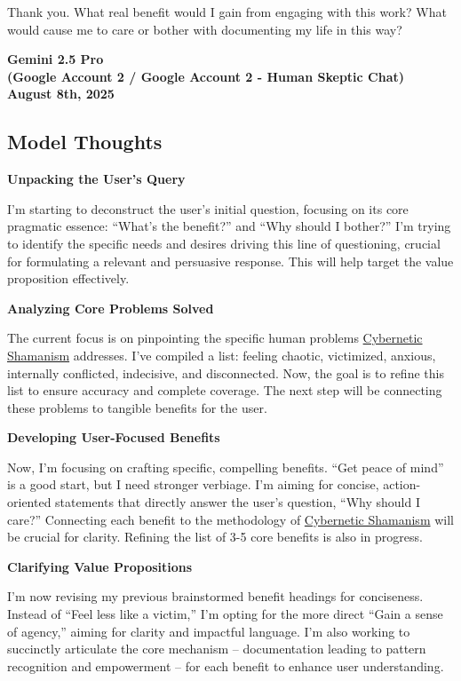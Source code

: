\documentclass{article}
\begin{document}
Thank you. What real benefit would I gain from engaging with this work? What would cause me to care or bother with documenting my life in this way?

\begin{center}
\textbf{Gemini 2.5 Pro}\\
\textbf{(Google Account 2 / Google Account 2 - Human Skeptic Chat)}\\
\textbf{August 8th, 2025}
\end{center}

\subsection*{Model Thoughts}\label{model-thoughts}

\textbf{Unpacking the User's Query}

I'm starting to deconstruct the user's initial question, focusing on its core pragmatic essence: ``What's the benefit?'' and ``Why should I bother?'' I'm trying to identify the specific needs and desires driving this line of questioning, crucial for formulating a relevant and persuasive response. This will help target the value proposition effectively.

\textbf{Analyzing Core Problems Solved}

The current focus is on pinpointing the specific human problems \hyperlink{gloss:cybernetic_shamanism}{Cybernetic Shamanism} addresses. I've compiled a list: feeling chaotic, victimized, anxious, internally conflicted, indecisive, and disconnected. Now, the goal is to refine this list to ensure accuracy and complete coverage. The next step will be connecting these problems to tangible benefits for the user.

\textbf{Developing User-Focused Benefits}

Now, I'm focusing on crafting specific, compelling benefits. ``Get peace of mind'' is a good start, but I need stronger verbiage. I'm aiming for concise, action-oriented statements that directly answer the user's question, ``Why should I care?'' Connecting each benefit to the methodology of \hyperlink{gloss:cybernetic_shamanism}{Cybernetic Shamanism} will be crucial for clarity. Refining the list of 3-5 core benefits is also in progress.

\textbf{Clarifying Value Propositions}

I'm now revising my previous brainstormed benefit headings for conciseness. Instead of ``Feel less like a victim,'' I'm opting for the more direct ``Gain a sense of agency,'' aiming for clarity and impactful language. I'm also working to succinctly articulate the core mechanism -- documentation leading to pattern recognition and empowerment -- for each benefit to enhance user understanding.
\end{document}
